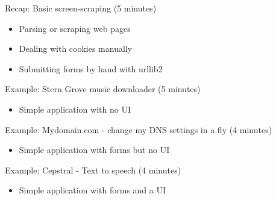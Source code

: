 \documentclass[10pt,a4paper,english]{article}
\begin{document}
\setcounter{listcnt0}{0}
\begin{list}{.}
{
\addtocounter{listcnt0}{8}
\setlength{\rightmargin}{\leftmargin}
}
\item {} 
Recap: Basic screen-scraping (5 minutes)

\end{list}
\begin{itemize}
\item {} 
Parsing or scraping web pages

\item {} 
Dealing with cookies manually

\item {} 
Submitting forms by hand with urllib2

\end{itemize}
\setcounter{listcnt0}{0}
\begin{list}{.}
{
\addtocounter{listcnt0}{9}
\setlength{\rightmargin}{\leftmargin}
}
\item {} 
Example: Stern Grove music downloader (5 minutes)

\end{list}
\begin{itemize}
\item {} 
Simple application with no UI

\end{itemize}
\setcounter{listcnt0}{0}
\begin{list}{.}
{
\addtocounter{listcnt0}{10}
\setlength{\rightmargin}{\leftmargin}
}
\item {} 
Example: Mydomain.com - change my DNS settings in a fly (4 minutes)

\end{list}
\begin{itemize}
\item {} 
Simple application with forms but no UI

\end{itemize}
\setcounter{listcnt0}{0}
\begin{list}{.}
{
\addtocounter{listcnt0}{11}
\setlength{\rightmargin}{\leftmargin}
}
\item {} 
Example: Cepstral - Text to speech (4 minutes)

\end{list}
\begin{itemize}
\item {} 
Simple application with forms and a UI

\end{itemize}
\end{document}
